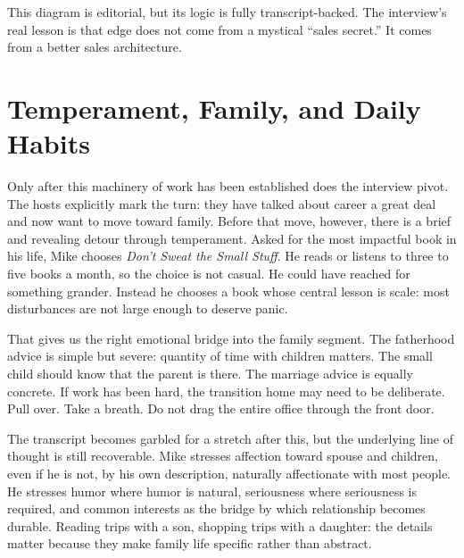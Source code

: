 \begin{figure}
\centering
{}
\end{figure}

This diagram is editorial, but its logic is fully transcript-backed. The interview's real lesson is that edge does not come from a mystical ``sales secret.'' It comes from a better sales architecture.

\section{Temperament, Family, and Daily Habits}

Only after this machinery of work has been established does the interview pivot. The hosts explicitly mark the turn: they have talked about career a great deal and now want to move toward family. Before that move, however, there is a brief and revealing detour through temperament. Asked for the most impactful book in his life, Mike chooses \textit{Don't Sweat the Small Stuff}. He reads or listens to three to five books a month, so the choice is not casual. He could have reached for something grander. Instead he chooses a book whose central lesson is scale: most disturbances are not large enough to deserve panic.

That gives us the right emotional bridge into the family segment. The fatherhood advice is simple but severe: quantity of time with children matters. The small child should know that the parent is there. The marriage advice is equally concrete. If work has been hard, the transition home may need to be deliberate. Pull over. Take a breath. Do not drag the entire office through the front door.

The transcript becomes garbled for a stretch after this, but the underlying line of thought is still recoverable. Mike stresses affection toward spouse and children, even if he is not, by his own description, naturally affectionate with most people. He stresses humor where humor is natural, seriousness where seriousness is required, and common interests as the bridge by which relationship becomes durable. Reading trips with a son, shopping trips with a daughter: the details matter because they make family life specific rather than abstract.

